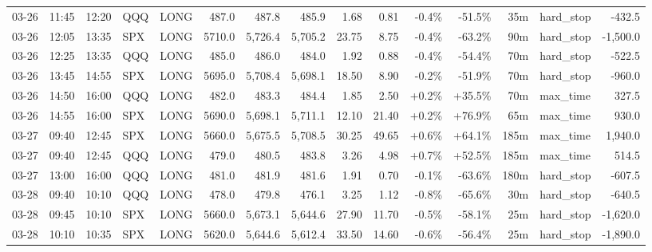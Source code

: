 \documentclass[11pt,a4paper,twoside]{article}
\begin{document}
\begin{landscape}
\begin{center}
\begin{longtable}{>{\color{txtmain}}l l l l l r r r r r r r r >{\color{txtmain}}l r}
03-26 & 11:45 & 12:20 & QQQ & LONG & 487.0 & 487.8 & 485.9 & 1.68 & 0.81 & \textcolor{lossred}{-0.4\%} & \textcolor{lossred}{-51.5\%} & 35m & hard\_stop & \textcolor{lossred}{-432.5} \\
03-26 & 12:05 & 13:35 & SPX & LONG & 5710.0 & 5,726.4 & 5,705.2 & 23.75 & 8.75 & \textcolor{lossred}{-0.4\%} & \textcolor{lossred}{-63.2\%} & 90m & hard\_stop & \textcolor{lossred}{-1,500.0} \\
03-26 & 12:25 & 13:35 & QQQ & LONG & 485.0 & 486.0 & 484.0 & 1.92 & 0.88 & \textcolor{lossred}{-0.4\%} & \textcolor{lossred}{-54.4\%} & 70m & hard\_stop & \textcolor{lossred}{-522.5} \\
03-26 & 13:45 & 14:55 & SPX & LONG & 5695.0 & 5,708.4 & 5,698.1 & 18.50 & 8.90 & \textcolor{lossred}{-0.2\%} & \textcolor{lossred}{-51.9\%} & 70m & hard\_stop & \textcolor{lossred}{-960.0} \\
03-26 & 14:50 & 16:00 & QQQ & LONG & 482.0 & 483.3 & 484.4 & 1.85 & 2.50 & \textcolor{wingreen}{+0.2\%} & \textcolor{wingreen}{+35.5\%} & 70m & max\_time & \textcolor{wingreen}{327.5} \\
03-26 & 14:55 & 16:00 & SPX & LONG & 5690.0 & 5,698.1 & 5,711.1 & 12.10 & 21.40 & \textcolor{wingreen}{+0.2\%} & \textcolor{wingreen}{+76.9\%} & 65m & max\_time & \textcolor{wingreen}{930.0} \\
03-27 & 09:40 & 12:45 & SPX & LONG & 5660.0 & 5,675.5 & 5,708.5 & 30.25 & 49.65 & \textcolor{wingreen}{+0.6\%} & \textcolor{wingreen}{+64.1\%} & 185m & max\_time & \textcolor{wingreen}{1,940.0} \\
03-27 & 09:40 & 12:45 & QQQ & LONG & 479.0 & 480.5 & 483.8 & 3.26 & 4.98 & \textcolor{wingreen}{+0.7\%} & \textcolor{wingreen}{+52.5\%} & 185m & max\_time & \textcolor{wingreen}{514.5} \\
03-27 & 13:00 & 16:00 & QQQ & LONG & 481.0 & 481.9 & 481.6 & 1.91 & 0.70 & \textcolor{lossred}{-0.1\%} & \textcolor{lossred}{-63.6\%} & 180m & hard\_stop & \textcolor{lossred}{-607.5} \\
03-28 & 09:40 & 10:10 & QQQ & LONG & 478.0 & 479.8 & 476.1 & 3.25 & 1.12 & \textcolor{lossred}{-0.8\%} & \textcolor{lossred}{-65.6\%} & 30m & hard\_stop & \textcolor{lossred}{-640.5} \\
03-28 & 09:45 & 10:10 & SPX & LONG & 5660.0 & 5,673.1 & 5,644.6 & 27.90 & 11.70 & \textcolor{lossred}{-0.5\%} & \textcolor{lossred}{-58.1\%} & 25m & hard\_stop & \textcolor{lossred}{-1,620.0} \\
03-28 & 10:10 & 10:35 & SPX & LONG & 5620.0 & 5,644.6 & 5,612.4 & 33.50 & 14.60 & \textcolor{lossred}{-0.6\%} & \textcolor{lossred}{-56.4\%} & 25m & hard\_stop & \textcolor{lossred}{-1,890.0} \\

\end{longtable}
\end{center}
\end{landscape}
\end{document}
